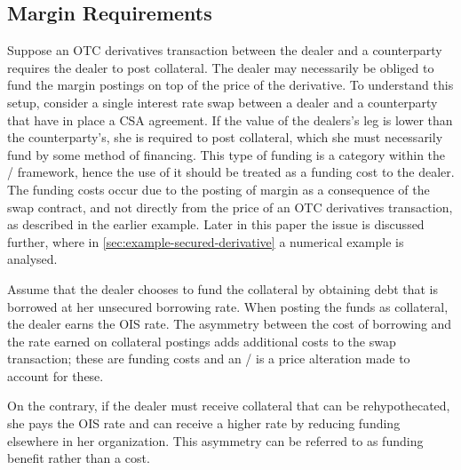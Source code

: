 \documentclass[main.tex]{subfiles}
\begin{document}
        \subsection*{Margin Requirements}
            Suppose an OTC derivatives transaction between the dealer 
            and a counterparty requires the dealer to post collateral.
            The dealer may necessarily be obliged to fund the margin postings on top of the price of the derivative.
            To understand this setup,
            consider a single interest rate swap between a dealer and a counterparty that have in place a CSA agreement.
            If the value of the dealers's leg is lower than the counterparty's,
            she is required to post collateral, 
            which she must necessarily fund by some method of financing.
            This type of funding is a category within the \FVA/ framework, 
            hence the use of it should be treated as a funding cost to the dealer.
            The funding costs occur due to the posting of margin as a consequence of the swap contract,
            and not directly from the price of an OTC derivatives transaction,
            as described in the earlier example.
            Later in this paper the issue is discussed further, 
            where in \cref{sec:example-secured-derivative} a numerical example is analysed.
            
            Assume that the dealer chooses to fund the collateral by obtaining debt
            that is borrowed at her unsecured borrowing rate.
            When posting the funds as collateral, the dealer earns the OIS rate.
            The asymmetry between the cost of borrowing and the rate earned on collateral postings
            adds additional costs to the swap transaction; 
            these are funding costs and an \FVA/ is a price alteration made to account for these.

            On the contrary, if the dealer must receive collateral that can be rehypothecated,
            she pays the OIS rate and can receive a higher rate
            by reducing funding elsewhere in her organization.
            This asymmetry can be referred to as funding benefit rather than a cost.
\end{document}
